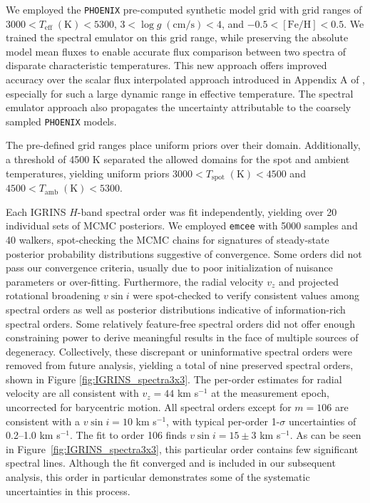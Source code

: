 \documentclass[twocolumn,tighten]{aastex631}
\begin{document}
We employed the \texttt{PHOENIX} pre-computed synthetic model grid \citep{husser13} with grid ranges of $3000 < T_{\mathrm{eff}} \; (\textrm{K}) < 5300 $, $3 < \log{g \;(\textrm{cm/s})}  < 4 $, and $ -0.5 <  [\mathrm{Fe}/\mathrm{H}] <0.5$.  We trained the spectral emulator \citep{czekala15} on this grid range, while preserving the absolute model mean fluxes to enable accurate flux comparison between two spectra of disparate characteristic temperatures.  This new approach offers improved accuracy over the scalar flux interpolated approach introduced in Appendix A of \citet{gullysantiago17}, especially for such a large dynamic range in effective temperature.  The spectral emulator approach also propagates the uncertainty attributable to the coarsely sampled \texttt{PHOENIX} models.

The pre-defined grid ranges place uniform priors over their domain.  Additionally, a threshold of 4500 K separated the allowed domains for the spot and ambient temperatures, yielding uniform priors $3000 < T_{\mathrm{spot}} \; (\mathrm{K}) < 4500 $ and $4500 < T_{\mathrm{amb}} \; (\mathrm{K}) < 5300$.

Each IGRINS $H$-band spectral order was fit independently, yielding over 20 individual sets of MCMC posteriors.  We employed \texttt{emcee} \citep{foreman13} with 5000 samples and 40 walkers, spot-checking the MCMC chains for signatures of steady-state posterior probability distributions suggestive of convergence.  Some orders did not pass our convergence criteria, usually due to poor initialization of nuisance parameters or over-fitting.  Furthermore, the radial velocity $v_z$ and projected rotational broadening $v\sin{i}$ were spot-checked to verify consistent values among spectral orders as well as posterior distributions indicative of information-rich spectral orders.  Some relatively feature-free spectral orders did not offer enough constraining power to derive meaningful results in the face of multiple sources of degeneracy.  Collectively, these discrepant or uninformative spectral orders were removed from future analysis, yielding a total of nine preserved spectral orders, shown in Figure \ref{fig:IGRINS_spectra3x3}. The per-order estimates for radial velocity are all consistent with $v_z=44$ km s$^{-1}$ at the measurement epoch, uncorrected for barycentric motion. All spectral orders except for $m=106$ are consistent with a $v\sin{i}=10$ km s$^{-1}$, with typical per-order 1-$\sigma$ uncertainties of 0.2--1.0 km s$^{-1}$. The fit to order 106 finds $v\sin{i}=15\pm3$ km s$^{-1}$. As can be seen in Figure~\ref{fig:IGRINS_spectra3x3}, this particular order contains few significant spectral lines. Although the fit converged and is included in our subsequent analysis, this order in particular demonstrates some of the systematic uncertainties in this process.
\end{document}
